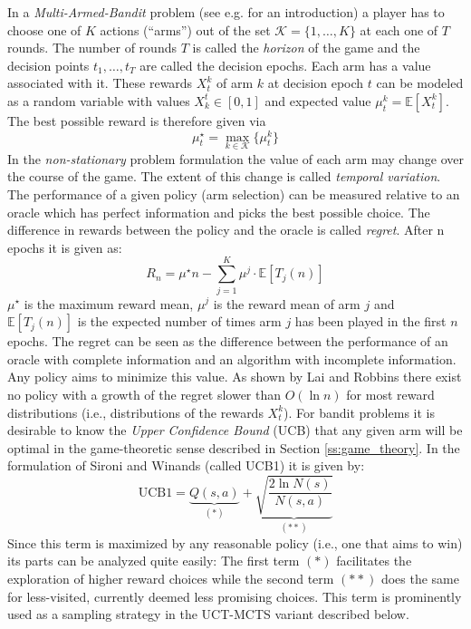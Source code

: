 In a \textit{Multi-Armed-Bandit} problem (see e.g. \cite{lattimore2018bandit} for an introduction) a player has to choose one of $K$ actions (\enquote{arms}) out of the set $\mathcal{K} = \{1,\ldots,K \}$ at each one of $T$ rounds. The number of rounds $T$ is called the \textit{horizon} of the game and the decision points $t_1,\ldots,t_T$ are called the decision epochs. Each arm has a value associated with it. These rewards $X^k_t$ of arm $k$ at decision epoch $t$ can be modeled as a random variable with values $X_k^t \in [0,1]$ and expected value $\mu_t^k = \mathbb{E}[X^k_t]$. The best possible reward is therefore given via 
\begin{equation*}
\mu^\star_t = \max_{k \in \mathcal{K}} \{ \mu^k_t\}    
\end{equation*}
In the \textit{non-stationary} problem formulation the value of each arm may change over the course of the game. The extent of this change is called \textit{temporal variation}. The performance of a given policy (arm selection) can be measured relative to an oracle which has perfect information and picks the best possible choice. The difference in rewards between the policy and the oracle is called \textit{regret}. After n epochs it is given as:
\begin{equation*}
    R_n = \mu^\star n - \sum_{j=1}^K \mu^j \cdot \mathbb{E}[T_j(n)]
\end{equation*} $\mu^\star$ is the maximum reward mean, $\mu^j$ is the reward mean of arm $j$ and $\mathbb{E}[T_j(n)]$ is the expected number of times arm $j$ has been played in the first $n$ epochs. The regret can be seen as the difference between the performance of an oracle with complete information and an algorithm with incomplete information. Any policy aims to minimize this value. As shown by Lai and Robbins \cite{lai1985asymptotically} there exist no policy with a growth of the regret slower than $O(\ln n)$ for most reward distributions (i.e., distributions of the rewards $X^k_t$). For bandit problems it is desirable to know the \textit{Upper Confidence Bound} (UCB) that any given arm will be optimal in the game-theoretic sense described in Section \ref{ss:game_theory}. In the formulation of Sironi and Winands \cite{sironi2019comparing} (called UCB1) it is given by:
\begin{equation*}
    \text{UCB1} = \underbrace{Q(s,a)}_{(\ast)} +  \underbrace{\sqrt{\frac{2 \ln N(s)}{N(s,a)}}}_{(\ast \ast)}
\end{equation*}
Since this term is maximized by any reasonable policy (i.e., one that aims to win) its parts can be analyzed quite easily: The first term $(\ast)$ facilitates the exploration of higher reward choices while the second term $(\ast \ast)$ does the same for less-visited, currently deemed less promising choices. This term is prominently used as a sampling strategy in the UCT-MCTS variant described below. 
